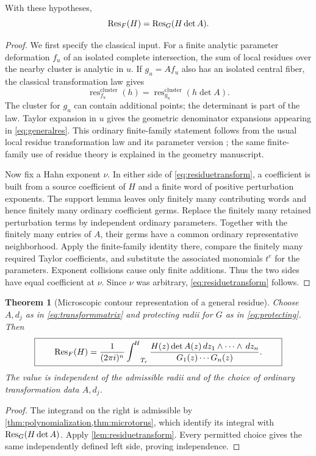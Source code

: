\documentclass[11pt,letterpaper]{article}
\newtheorem{theorem}{Theorem}[section]
\theoremstyle{definition}
\theoremstyle{remark}
\newcommand{\res}{\operatorname{res}}\newcommand{\Wind}{\operatorname{Wind}}
\newcommand{\HInt}{\mathop{\int^{\!H}}\nolimits}
\numberwithin{equation}{section}
\begin{document}
\begin{lemma}\label{lem:residuetransform}
With these hypotheses,
\begin{equation}\label{eq:residuetransform}
 \operatorname{Res}_F(H)=\operatorname{Res}_G(H\det A).
\end{equation}
\end{lemma}
\begin{proof}
We first specify the classical input. For a finite analytic parameter deformation $f_u$ of an isolated complete intersection, the sum of local residues over the nearby cluster is analytic in $u$. If $g_u=A f_u$ also has an isolated central fiber, the classical transformation law gives
\[
 \res^{\mathrm{cluster}}_{f_u}(h)
 =\res^{\mathrm{cluster}}_{g_u}(h\det A).
\]
The cluster for $g_u$ can contain additional points; the determinant is part of the law. Taylor expansion in $u$ gives the geometric denominator expansions appearing in \eqref{eq:generalres}. This ordinary finite-family statement follows from the usual local residue transformation law and its parameter version \cite{Tsikh,CDS}; the same finite-family use of residue theory is explained in the geometry manuscript.

Now fix a Hahn exponent $\nu$. In either side of \eqref{eq:residuetransform}, a coefficient is built from a source coefficient of $H$ and a finite word of positive perturbation exponents. The support lemma leaves only finitely many contributing words and hence finitely many ordinary coefficient germs. Replace the finitely many retained perturbation terms by independent ordinary parameters. Together with the finitely many entries of $A$, their germs have a common ordinary representative neighborhood. Apply the finite-family identity there, compare the finitely many required Taylor coefficients, and substitute the associated monomials $t^e$ for the parameters. Exponent collisions cause only finite additions. Thus the two sides have equal coefficient at $\nu$. Since $\nu$ was arbitrary, \eqref{eq:residuetransform} follows.
\end{proof}

\begin{theorem}[Microscopic contour representation of a general residue]\label{thm:generalrepresentation}
Choose $A,d_j$ as in \eqref{eq:transformmatrix} and protecting radii for $G$ as in \eqref{eq:protecting}. Then
\begin{equation}\label{eq:generalrepresentation}
 \boxed{\qquad
 \Res_F(H)=\frac1{(2\pi i)^n}
 \HInt_{T_r}
 \frac{H(z)\det A(z)\dd z_1\wedge\cdots\wedge\dd z_n}
 {G_1(z)\cdots G_n(z)}.
 \qquad}
\end{equation}
The value is independent of the admissible radii and of the choice of ordinary transformation data $A,d_j$.
\end{theorem}
\begin{proof}
The integrand on the right is admissible by \cref{thm:polynomialization,thm:microtorus}, which identify its integral with $\operatorname{Res}_G(H\det A)$. Apply \cref{lem:residuetransform}. Every permitted choice gives the same independently defined left side, proving independence.
\end{proof}
\end{document}
